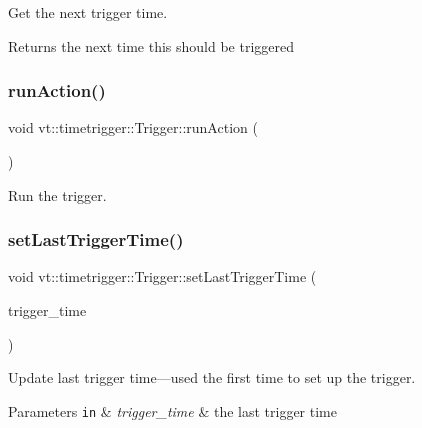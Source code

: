 Get the next trigger time. 

\begin{DoxyReturn}{Returns}
the next time this should be triggered 
\end{DoxyReturn}
\mbox{\label{structvt_1_1timetrigger_1_1_trigger_a29a10a659bf04e07cc0ced93bc7271e2}} 
\subsubsection{\texorpdfstring{run\+Action()}{runAction()}}
{\footnotesize\ttfamily void vt\+::timetrigger\+::\+Trigger\+::run\+Action (\begin{DoxyParamCaption}{ }\end{DoxyParamCaption})\hspace{0.3cm}{\ttfamily [inline]}}



Run the trigger. 

\mbox{\label{structvt_1_1timetrigger_1_1_trigger_aae694885195a12a0bd7274859bfaa0ba}} 
\subsubsection{\texorpdfstring{set\+Last\+Trigger\+Time()}{setLastTriggerTime()}}
{\footnotesize\ttfamily void vt\+::timetrigger\+::\+Trigger\+::set\+Last\+Trigger\+Time (\begin{DoxyParamCaption}\item[{\hyperlink{namespacevt_a876a9d0cd5a952859c72de8a46881442}{Time\+Type}}]{trigger\+\_\+time }\end{DoxyParamCaption})\hspace{0.3cm}{\ttfamily [inline]}}



Update last trigger time---used the first time to set up the trigger. 


\begin{DoxyParams}[1]{Parameters}
\mbox{\tt in}  & {\em trigger\+\_\+time} & the last trigger time \\
\hline
\end{DoxyParams}


